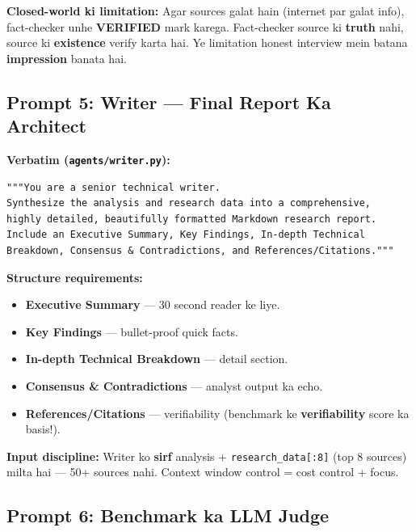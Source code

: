 \begin{warningbox}
\textbf{Closed-world ki limitation:} Agar sources galat hain (internet par galat info), fact-checker unhe \textbf{VERIFIED} mark karega. Fact-checker source ki \textbf{truth} nahi, source ki \textbf{existence} verify karta hai. Ye limitation honest interview mein batana \textbf{impression} banata hai.
\end{warningbox}

\subsection{Prompt 5: Writer --- Final Report Ka Architect}

\begin{codestorybox}
\textbf{Verbatim (\texttt{agents/writer.py}):}

\begin{lstlisting}[style=pythonstyle, caption={WRITER\_PROMPT}]
"""You are a senior technical writer.
Synthesize the analysis and research data into a comprehensive,
highly detailed, beautifully formatted Markdown research report.
Include an Executive Summary, Key Findings, In-depth Technical
Breakdown, Consensus & Contradictions, and References/Citations."""
\end{lstlisting}

\textbf{Structure requirements:}
\begin{itemize}
\item \textbf{Executive Summary} --- 30 second reader ke liye.
\item \textbf{Key Findings} --- bullet-proof quick facts.
\item \textbf{In-depth Technical Breakdown} --- detail section.
\item \textbf{Consensus \& Contradictions} --- analyst output ka echo.
\item \textbf{References/Citations} --- verifiability (benchmark ke \textbf{verifiability} score ka basis!).
\end{itemize}

\textbf{Input discipline:} Writer ko \textbf{sirf} analysis + \texttt{research\_data[:8]} (top 8 sources) milta hai --- 50+ sources nahi. Context window control = cost control + focus.
\end{codestorybox}

\subsection{Prompt 6: Benchmark ka LLM Judge}

